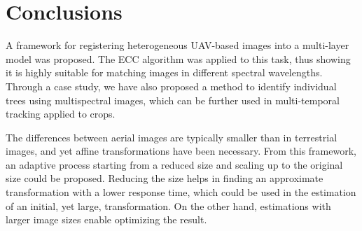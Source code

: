 \section{Conclusions}

A framework for registering heterogeneous UAV-based images into a multi-layer model was proposed. The ECC algorithm was applied to this task, thus showing it is highly suitable for matching images in different spectral wavelengths. Through a case study, we have also proposed a method to identify individual trees using multispectral images, which can be further used in multi-temporal tracking applied to crops.

The differences between aerial images are typically smaller than in terrestrial images, and yet affine transformations have been necessary. From this framework, an adaptive process starting from a reduced size and scaling up to the original size could be proposed. Reducing the size helps in finding an approximate transformation with a lower response time, which could be used in the estimation of an initial, yet large, transformation. On the other hand, estimations with larger image sizes enable optimizing the result. 

